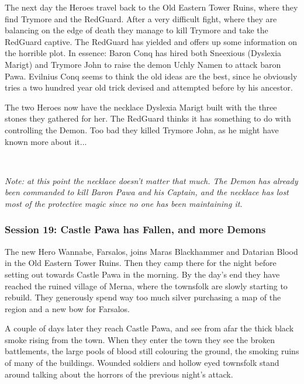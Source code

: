 The next day the Heroes travel back to the Old Eastern Tower Ruins, where they find Trymore and the RedGuard. After a very difficult fight, where they are balancing on the edge of death they manage to kill Trymore and take the RedGuard captive.
The RedGuard has yielded and offers up some information on the horrible plot. In essence: Baron Conq has hired both Sneexious (Dyslexia Marigt) and Trymore John to raise the demon Uchly Namen to attack baron Pawa. Evilnius Conq seems to think the old ideas are the best, since he obviously tries a two hundred year old trick devised and attempted before by his ancestor.

The two Heroes now have the necklace Dyslexia Marigt built with the three stones they gathered for her. The RedGuard thinks it has something to do with controlling the Demon. Too bad they killed Trymore John, as he might have known more about it...

\

\emph{Note: at this point the necklace doesn't matter that much. The Demon has already been commanded to kill Baron Pawa and his Captain, and the necklace has lost most of the protective magic since no one has been maintaining it.}


\subsubsection*{Session 19: Castle Pawa has Fallen, and more Demons}
The new Hero Wannabe, Farsalos, joins Maras Blackhammer and Datarian Blood in the Old Eastern Tower Ruins. Then they camp there for the night before setting out towards Castle Pawa in the morning. By the day's end they have reached the ruined village of Merna, where the townsfolk are slowly starting to rebuild. They generously spend way too much silver purchasing a map of the region and a new bow for Farsalos.

A couple of days later they reach Castle Pawa, and see from afar the thick black smoke rising from the town. When they enter the town they see the broken battlements, the large pools of blood still colouring the ground, the smoking ruins of many of the buildings. Wounded soldiers and hollow eyed townsfolk stand around talking about the horrors of the previous night's attack.

